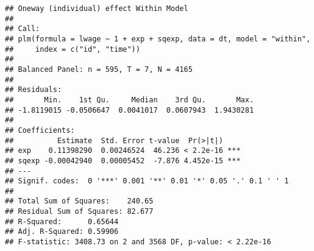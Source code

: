 \documentclass[
  12pt,
]{article}
\begin{document}
\begin{verbatim}
## Oneway (individual) effect Within Model
## 
## Call:
## plm(formula = lwage ~ 1 + exp + sqexp, data = dt, model = "within", 
##     index = c("id", "time"))
## 
## Balanced Panel: n = 595, T = 7, N = 4165
## 
## Residuals:
##       Min.    1st Qu.     Median    3rd Qu.       Max. 
## -1.8119015 -0.0506647  0.0041017  0.0607943  1.9430281 
## 
## Coefficients:
##          Estimate  Std. Error t-value  Pr(>|t|)    
## exp    0.11398290  0.00246524  46.236 < 2.2e-16 ***
## sqexp -0.00042940  0.00005452  -7.876 4.452e-15 ***
## ---
## Signif. codes:  0 '***' 0.001 '**' 0.01 '*' 0.05 '.' 0.1 ' ' 1
## 
## Total Sum of Squares:    240.65
## Residual Sum of Squares: 82.677
## R-Squared:      0.65644
## Adj. R-Squared: 0.59906
## F-statistic: 3408.73 on 2 and 3568 DF, p-value: < 2.22e-16
\end{verbatim}
\end{document}
